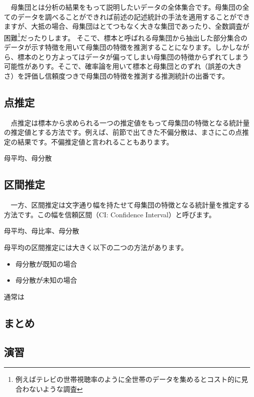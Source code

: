 \documentclass[
  12pt,
]{book}
\providecommand{\tightlist}{%
  \setlength{\itemsep}{0pt}\setlength{\parskip}{0pt}}
\begin{document}
　母集団とは分析の結果をもって説明したいデータの全体集合です。母集団の全てのデータを調べることができれば前述の記述統計の手法を適用することができますが、大抵の場合、母集団はとてつもなく大きな集団であったり、全数調査が困難\footnote{例えばテレビの世帯視聴率のように全世帯のデータを集めるとコスト的に見合わないような調査}だったりします。 そこで、標本と呼ばれる母集団から抽出した部分集合のデータが示す特徴を用いて母集団の特徴を推測することになります。しかしながら、標本のとり方よってはデータが偏ってしまい母集団の特徴からずれてしまう可能性がありす。そこで、確率論を用いて標本と母集団とのずれ（誤差の大きさ）を評価し信頼度つきで母集団の特徴を推測する推測統計の出番です。

\hypertarget{ux70b9ux63a8ux5b9a}{%
\subsection{点推定}\label{ux70b9ux63a8ux5b9a}}

　点推定は標本から求められる一つの推定値をもって母集団の特徴となる統計量の推定値とする方法です。例えば、前節で出てきた不偏分散は、まさにこの点推定の結果です。不偏推定値と言われることもあります。

母平均、母分散

\hypertarget{ux533aux9593ux63a8ux5b9a}{%
\subsection{区間推定}\label{ux533aux9593ux63a8ux5b9a}}

　一方、区間推定は文字通り幅を持たせて母集団の特徴となる統計量を推定する方法です。この幅を信頼区間（CI: Confidence Interval）と呼びます。

母平均、母比率、母分散

母平均の区間推定には大きく以下の二つの方法があります。

\begin{itemize}
\tightlist
\item
  母分散が既知の場合
\item
  母分散が未知の場合
\end{itemize}

通常は

\hypertarget{ux307eux3068ux3081-2}{%
\subsection{まとめ}\label{ux307eux3068ux3081-2}}

\hypertarget{ux6f14ux7fd2-4}{%
\subsection{演習}\label{ux6f14ux7fd2-4}}
\end{document}
